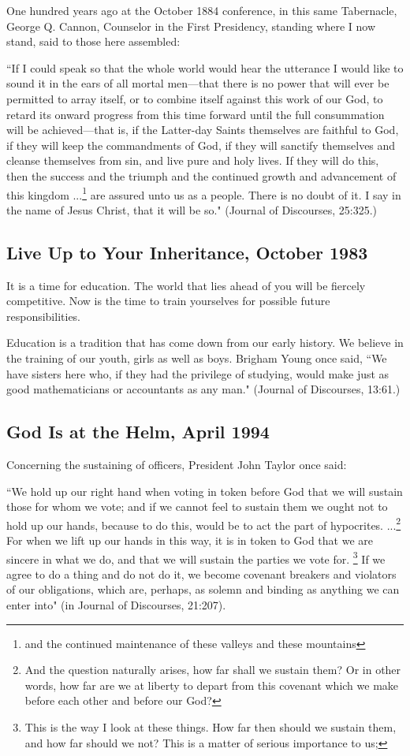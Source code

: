 One hundred years ago at the October 1884 conference, in this same Tabernacle, George Q. Cannon, Counselor in the First Presidency, standing where I now stand, said to those here assembled:

``If I could speak so that the whole world would hear the utterance I would like to sound it in the ears of all mortal men—that there is no power that will ever be permitted to array itself, or to combine itself against this work of our God, to retard its onward progress from this time forward until the full consummation will be achieved—that is, if the Latter-day Saints themselves are faithful to God, if they will keep the commandments of God, if they will sanctify themselves and cleanse themselves from sin, and live pure and holy lives. If they will do this, then the success and the triumph and the continued growth and advancement of this kingdom ...\footnote{and the continued maintenance of these valleys and these mountains} are assured unto us as a people. There is no doubt of it. I say in the name of Jesus Christ, that it will be so." (Journal of Discourses, 25:325.)

\subsection{Live Up to Your Inheritance, October 1983}

It is a time for education. The world that lies ahead of you will be fiercely competitive. Now is the time to train yourselves for possible future responsibilities.

Education is a tradition that has come down from our early history. We believe in the training of our youth, girls as well as boys. Brigham Young once said, ``We have sisters here who, if they had the privilege of studying, would make just as good mathematicians or accountants as any man." (Journal of Discourses, 13:61.)

\subsection {God Is at the Helm, April 1994}

Concerning the sustaining of officers, President John Taylor once said:

``We hold up our right hand when voting in token before God that we will sustain those for whom we vote; and if we cannot feel to sustain them we ought not to hold up our hands, because to do this, would be to act the part of hypocrites. ...\footnote{And the question naturally arises, how far shall we sustain them? Or in other words, how far are we at liberty to depart from this covenant which we make before each other and before our God?} For when we lift up our hands in this way, it is in token to God that we are sincere in what we do, and that we will sustain the parties we vote for. \footnote{This is the way I look at these things. How far then should we sustain them, and how far should we not? This is a matter of serious importance to us;} If we agree to do a thing and do not do it, we become covenant breakers and violators of our obligations, which are, perhaps, as solemn and binding as anything we can enter into" (in Journal of Discourses, 21:207).